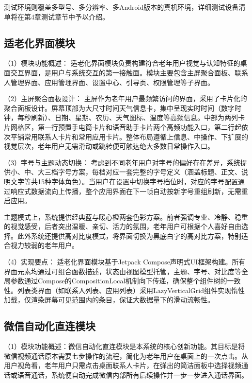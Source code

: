 测试环境则覆盖多型号、多分辨率、多Android版本的真机环境，详细测试设备清单将在第4章测试章节中予以介绍。

\subsection{适老化界面模块}

（1）模块功能概述：
适老化界面模块负责构建符合老年用户视觉与认知特征的桌面交互界面，是用户与系统交互的第一接触面。模块主要包含主屏聚合面板、联系人管理界面、应用管理界面、设置中心、引导页、权限管理等子界面。

（2）主屏聚合面板设计：
主屏作为老年用户最频繁访问的界面，采用了卡片化的聚合面板设计。屏幕顶部为大尺寸时间天气信息卡，集中呈现实时时间（数字时钟，每秒刷新）、日期、星期、农历、天气图标、温度等高频信息。中部为两列卡片网格区，第一行预置手电筒卡片和语音助手卡片两个高频功能入口，第二行起依次平铺常用联系人卡片和常用应用卡片。整体布局遵循上信息、中操作、下扩展的视觉层次，老年用户无需滑动或跳转便可触达绝大多数日常操作入口。

（3）字号与主题动态切换：
考虑到不同老年用户对字号的偏好存在差异，系统提供小、中、大三档字号方案，每档对应一套完整的字号定义（涵盖标题、正文、说明文字等共15种字体角色）。当用户在设置中切换字号档位时，对应的字号配置通过响应式数据流向上传播，整个应用界面在下一帧自动按新字号重组刷新，无需重启应用。

主题模式上，系统提供经典蓝与暖心橙两套色彩方案。前者强调专业、冷静、稳重的视觉感受，后者突出温暖、亲切、活力的氛围，老年用户可根据个人喜好自由选择。此外系统还提供高对比度模式，将界面切换为黑底白字的高对比方案，特别适合视力较弱的老年用户。

（4）实现要点：
适老化界面模块基于Jetpack Compose声明式UI框架构建。所有界面元素均通过可组合函数描述，状态由视图模型托管，主题、字号、对比度等全局参数通过Compose的CompositionLocal机制向下传递，确保整个组件树的一致性。列表类界面（如联系人列表、应用列表）采用LazyVerticalGrid组件实现惰性加载，仅渲染屏幕可见范围内的条目，保证大数据量下的滑动流畅性。

\subsection{微信自动化直连模块}
（1）模块功能概述：微信自动化直连模块是本系统的核心创新功能。其目标是将微信视频通话原本需要七步操作的流程，简化为老年用户在桌面上的一次点击。从用户视角看，老年用户只需点击桌面联系人卡片，在弹出的简洁面板中选择视频通话或语音通话，系统便自动完成微信内部所有后续操作并一步一步进入通话界面。

